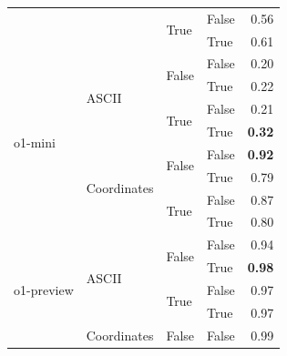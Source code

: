 \documentclass{article}
\begin{document}
\begin{table}
\begin{center}
{\begin{tabular}{@{}llllr@{}}
                                    &                                   & \multirow[c]{2}{*}{True}  & False                     & 0.56 \\
                                    &                                   &                           & True                      & 0.61 \\
    \midrule
    \multirow[c]{8}{*}{o1-mini}     & \multirow[c]{4}{*}{ASCII}         & \multirow[c]{2}{*}{False} & False                     & 0.20 \\
                                    &                                   &                           & True                      & 0.22 \\
                                    &                                   & \multirow[c]{2}{*}{True}  & False                     & 0.21 \\
                                    &                                   &                           & True                      & \textbf{0.32} \\
    \cmidrule{2-5}
                                    & \multirow[c]{4}{*}{Coordinates}   & \multirow[c]{2}{*}{False} & False                     & \textbf{0.92} \\
                                    &                                   &                           & True                      & 0.79 \\
                                    &                                   & \multirow[c]{2}{*}{True}  & False                     & 0.87 \\
                                    &                                   &                           & True                      & 0.80 \\
    \midrule
    \multirow[c]{8}{*}{o1-preview}  & \multirow[c]{4}{*}{ASCII}         & \multirow[c]{2}{*}{False} & False                     & 0.94 \\
                                    &                                   &                           & True                      & \textbf{0.98} \\
                                    &                                   & \multirow[c]{2}{*}{True}  & False                     & 0.97 \\
                                    &                                   &                           & True                      & 0.97 \\
    \cmidrule{2-5}
                                    & \multirow[c]{4}{*}{Coordinates}   & \multirow[c]{2}{*}{False} & False                     & 0.99 \\

\end{tabular}}
\end{center}
\end{table}
\end{document}
